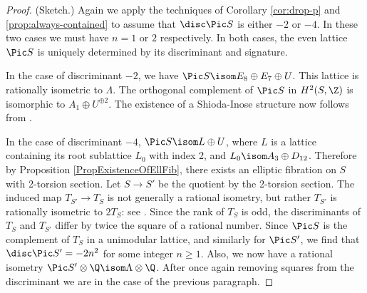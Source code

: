 \documentclass{article}
\newcommand{\adam}[1]{\textcolor{blue}{#1}}
\begin{document}
\begin{proof} (Sketch.)  Again we apply the techniques of Corollary \ref{cor:drop-p} and \ref{prop:always-contained} to assume that $\disc \Pic S$ is either $-2$ or $-4$.  In these two cases we must have $n = 1$ or $2$ respectively.
  In both cases, the even lattice $\Pic S$ is uniquely determined by its discriminant and signature.

In the case of discriminant $-2$, we have $\Pic S\isom E_8\oplus E_7\oplus U$.   This lattice is rationally isometric to $\Lambda$. The orthogonal complement of $\Pic S$ in $H^2(S,\Z)$ is isomorphic to $A_1\oplus U^{\oplus 2}$.  The existence of a Shioda-Inose structure
  now follows from \cite[Corollary 6.4 (iii)]{morr}.
  
  In the case of discriminant $-4$, $\Pic S\isom L\oplus U$, where $L$ is a lattice containing its root sublattice $L_0$ with index 2, and $L_0\isom A_3\oplus D_{12}$.  Therefore by Proposition \ref{PropExistenceOfEllFib}, there exists an elliptic fibration on $S$ with 2-torsion section.  Let $S\to S'$ be the quotient by the 2-torsion section.  The induced map $T_{S'}\to T_S$ is not generally a rational isometry, but rather $T_{S'}$ is rationally isometric to $2T_{S}$:  see \cite[\S 2.4]{BSV}.  Since the rank of $T_S$ is odd,  
the discriminants of $T_S$ and $T_{S'}$ differ by twice the square of a rational number.   Since $\Pic S$ is the complement of $T_S$ in a unimodular lattice, and similarly for $\Pic S'$, we find that $\disc \Pic S'=-2n^2$ for some integer $n\geq 1$.  Also, we now have a rational
  isometry $\Pic S' \otimes \Q \isom \Lambda \otimes \Q$.  After once again removing squares from the discriminant we are in the case of the previous paragraph.
\end{proof}
%
%
%
%
\end{document}
